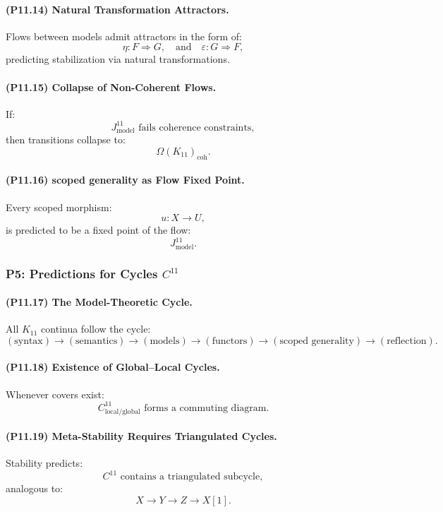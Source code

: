 \paragraph{(P11.14) Natural Transformation Attractors.}
Flows between models admit attractors in the form of:
\[
\eta: F \Rightarrow G,
\quad\text{and}\quad
\varepsilon: G \Rightarrow F,
\]
predicting stabilization via natural transformations.

\paragraph{(P11.15) Collapse of Non-Coherent Flows.}
If:
\[
J_{\mathrm{model}}^{11}
\text{ fails coherence constraints},
\]
then transitions collapse to:
\[
\Omega(K_{11})_{\mathrm{coh}}.
\]

\paragraph{(P11.16) scoped generality as Flow Fixed Point.}
Every scoped morphism:
\[
u: X \to U,
\]
is predicted to be a fixed point of the flow:
\[
J_{\mathrm{model}}^{11}.
\]

\subsubsection{P5: Predictions for Cycles $C^{11}$}

\paragraph{(P11.17) The Model-Theoretic Cycle.}
All $K_{11}$ continua follow the cycle:
\[
(\text{syntax}) \to (\text{semantics})
\to (\text{models}) \to (\text{functors})
\to (\text{scoped generality}) \to (\text{reflection}).
\]

\paragraph{(P11.18) Existence of Global–Local Cycles.}
Whenever covers exist:
\[
C_{\mathrm{local/global}}^{11}
\text{ forms a commuting diagram.}
\]

\paragraph{(P11.19) Meta-Stability Requires Triangulated Cycles.}
Stability predicts:
\[
C^{11} \text{ contains a triangulated subcycle},
\]
analogous to:
\[
X \to Y \to Z \to X[1].
\]

